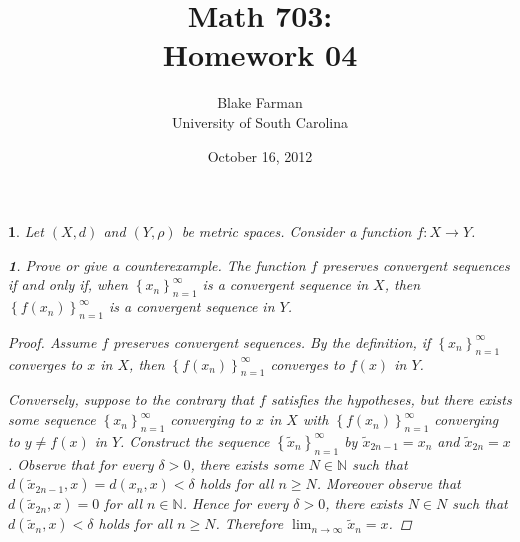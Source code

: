 \documentclass[12pt]{amsart}
\author{Blake Farman\\University of South Carolina}
\title{Math 703:\\Homework 04}
\date{October 16, 2012}
\begin{document}
\maketitle

\providecommand{\norm}[1]{\lVert#1\rVert}
\renewcommand{\qedsymbol}{\ensuremath{\blacksquare}}
\newcommand{\abs}[1]{\left| #1 \right|}
\newcommand{\dist}[2]{\operatorname{dist}\left(#1,#2\right)}

\newtheorem{setup}{}
\setcounter{setup}{12}
\newtheorem{ex}{}[setup]
\newtheorem{lem}{Lemma}

\begin{setup}
  Let $(X, d)$ and $(Y,\rho)$ be metric spaces.
  Consider a function $f \colon X \rightarrow Y$.
  \begin{ex}
    Prove or give a counterexample.
    The function $f$ preserves convergent sequences if and only if, when $\left\{x_n\right\}_{n=1}^\infty$ is a convergent sequence in $X$, then $\left\{f(x_n)\right\}_{n=1}^\infty$ is a convergent sequence in $Y$.
    \begin{proof}
      Assume $f$ preserves convergent sequences.
      By the definition, if $\left\{x_n\right\}_{n=1}^\infty$ converges to $x$ in $X$, then $\left\{f(x_n)\right\}_{n=1}^\infty$ converges to $f(x)$ in $Y$.
      
      Conversely, suppose to the contrary that $f$ satisfies the hypotheses, but there exists some sequence $\left\{x_n\right\}_{n=1}^\infty$ converging to $x$ in $X$ with $\left\{f(x_n)\right\}_{n=1}^\infty$ converging to $y \not = f(x)$ in $Y$.
      Construct the sequence $\left\{\tilde{x}_n\right\}_{n=1}^\infty$ by $\tilde{x}_{2n-1} = x_n$ and $\tilde{x}_{2n} = x$.
      Observe that for every $\delta > 0$, there exists some $N \in \mathbb{N}$ such that $d(\tilde{x}_{2n-1},x) = d(x_n, x) < \delta$ holds for all $n \geq N$.
      Moreover observe that $d(\tilde{x}_{2n}, x) = 0$ for all $n \in \mathbb{N}$.
      Hence for every $\delta > 0$, there exists $N \in N$ such that $d(\tilde{x}_n, x) < \delta$ holds for all $n \geq N$.
      Therefore $\lim_{n\rightarrow\infty} \tilde{x}_n = x$.
      

\end{proof}
\end{ex}
\end{setup}
\end{document}
